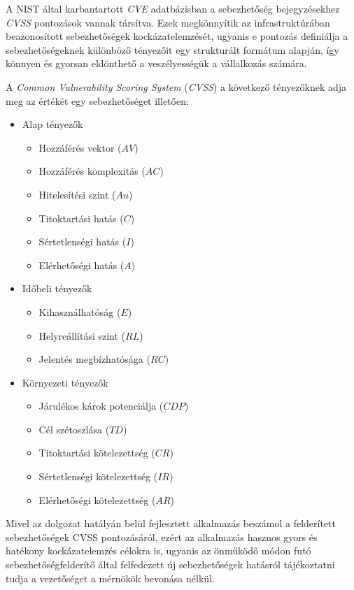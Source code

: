 \documentclass[a4paper,12pt]{article}
\begin{document}
	A NIST által karbantartott \textit{CVE} adatbázisban a sebezhetőség bejegyzésekhez \textit{CVSS} pontozások vannak társítva. Ezek megkönnyítik az infrastruktúrában beazonosított sebezhetőségek kockázatelemzését, ugyanis e pontozás definiálja a sebezhetőségeknek különböző tényezőit egy strukturált formátum alapján, így könnyen és gyorsan eldönthető a veszélyességük a vállalkozás számára.
	
	A \textit{Common Vulnerability Scoring System}\cite{cvssv2} (\textit{CVSS}) a következő tényezőknek adja meg az értékét egy sebezhetőséget illetően:
	
	\begin{multicols}{2}
		\begin{itemize}
			\item Alap tényezők
				\begin{itemize}
					\item Hozzáférés vektor ($AV$)
					\item Hozzáférés komplexitás ($AC$)
					\item Hitelesítési szint ($Au$)
					\item Titoktartási hatás ($C$)
					\item Sértetlenségi hatás ($I$)
					\item Elérhetőségi hatás ($A$)
				\end{itemize}
			\item Időbeli tényezők
				\begin{itemize}
					\item Kihasználhatóság ($E$)
					\item Helyreállítási szint ($RL$)
					\item Jelentés megbízhatósága ($RC$)
				\end{itemize}
			\item Környezeti tényezők
				\begin{itemize}
					\item Járulékos károk potenciálja ($CDP$)
					\item Cél szétoszlása ($TD$)
					\item Titoktartási kötelezettség ($CR$)
					\item Sértetlenségi kötelezettség ($IR$)
					\item Elérhetőségi kötelezettség ($AR$)
				\end{itemize}
		\end{itemize}
	\end{multicols}
	
	Mivel az dolgozat hatályán belül fejlesztett alkalmazás beszámol a felderített sebezhetőségek CVSS pontozásáról, ezért az alkalmazás hasznos gyors és hatékony kockázatelemzés célokra is, ugyanis az önműködő módon futó sebezhetőségfelderítő által felfedezett új sebezhetőségek hatásról tájékoztatni tudja a vezetőséget a mérnökök bevonása nélkül.
	
\end{document}
